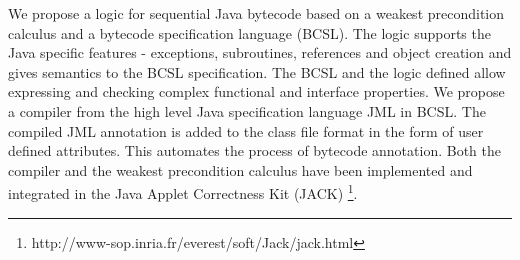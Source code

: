 We propose a logic for sequential Java bytecode based on a weakest precondition calculus and a bytecode specification language (BCSL). 
The logic supports the Java specific features - exceptions, subroutines, references and object creation and gives semantics to the BCSL specification. The BCSL and the logic defined  allow expressing and checking complex functional and interface properties. We propose a compiler from the high level Java specification language JML in BCSL. The compiled JML annotation is added to the class file format in the form of user defined attributes. This automates the process of bytecode annotation.  Both the compiler and the weakest precondition calculus have been implemented and integrated in the Java Applet Correctness Kit (JACK) \footnote{http://www-sop.inria.fr/everest/soft/Jack/jack.html}.



